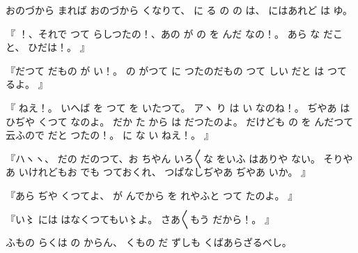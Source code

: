 おのづから
まれば
おのづから
くなりて、
に
る
の
の
は、
にはあれど
は
ゆ。

『
！、それで
つて
らしつたの！、あの
が
の
を
んだ
なの！。
あら
な
だこと、
ひだは！。
』

『だつて
だもの
が
い！。
の
がつて
に
つたのだもの
つて
しい
だと
は
つて
るよ。
』

『
ねえ！。
いへば
を
つて
を
いたつて。
アヽ
り
は
い
なのね！。
ぢやあ
は
ひぢや
くつて
なのよ。
だか
た
から
は
だつたのよ。
だけども
の
を
んだつて云ふので
だと
つたの！。
に
な
い
ねえ！。
』

『ハヽヽ、
だの
だのつて、お
ちやん
いろ〳〵な
をいふ
はありや
ない。
そりやあ
いけれどもお
でも
つておくれ、
つぱなしぢやあ
ぢやあ
いか。
』

『あら
ぢや
くつてよ、
が
んでから
を
れやふと
つて
たのよ。
』

『い〻
には
はなくつてもい〻よ。
さあ〳〵もう
だから！。
』

ふもの
らくは
の
からん、
くもの
だ
ずしも
くばあらざるべし。

